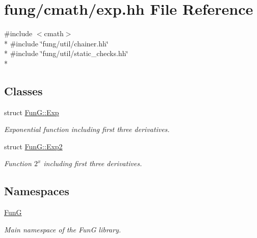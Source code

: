 \hypertarget{exp_8hh}{}\section{fung/cmath/exp.hh File Reference}
\label{exp_8hh}
{\ttfamily \#include $<$cmath$>$}\\*
{\ttfamily \#include \char`\"{}fung/util/chainer.\+hh\char`\"{}}\\*
{\ttfamily \#include \char`\"{}fung/util/static\+\_\+checks.\+hh\char`\"{}}\\*
\subsection*{Classes}
\begin{DoxyCompactItemize}
\item 
struct \hyperlink{structFunG_1_1Exp}{Fun\+G\+::\+Exp}
\begin{DoxyCompactList}\small\item\em Exponential function including first three derivatives. \end{DoxyCompactList}\item 
struct \hyperlink{structFunG_1_1Exp2}{Fun\+G\+::\+Exp2}
\begin{DoxyCompactList}\small\item\em Function $2^x$ including first three derivatives. \end{DoxyCompactList}\end{DoxyCompactItemize}
\subsection*{Namespaces}
\begin{DoxyCompactItemize}
\item 
 \hyperlink{namespaceFunG}{Fun\+G}
\begin{DoxyCompactList}\small\item\em Main namespace of the Fun\+G library. \end{DoxyCompactList}\end{DoxyCompactItemize}
